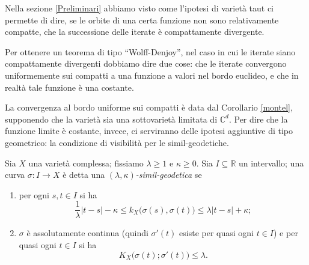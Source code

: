 Nella sezione \ref{Preliminari} abbiamo visto come l'ipotesi di varietà taut ci permette di dire, se le orbite di una certa funzione non sono relativamente compatte, che la successione delle iterate è compattamente divergente.

Per ottenere un teorema di tipo ``Wolff-Denjoy'', nel caso in cui le iterate siano compattamente divergenti dobbiamo dire due cose: che le iterate convergono uniformemente sui compatti a una funzione a valori nel bordo euclideo, e che in realtà tale funzione è una costante.

La convergenza al bordo uniforme sui compatti è data dal Corollario \ref{montel}, supponendo che la varietà sia una sottovarietà limitata di $\mathbb{C}^d$. Per dire che la funzione limite è costante, invece, ci serviranno delle ipotesi aggiuntive di tipo geometrico: la condizione di visibilità per le simil-geodetiche.

\begin{defn}
    Sia $X$ una varietà complessa; fissiamo $\lambda \ge 1$ e $\kappa \ge 0$. Sia $I\subseteq \mathbb{R}$ un intervallo; una curva $\sigma:I \longrightarrow X$ è detta una \textit{$(\lambda,\kappa)$-simil-geodetica} se
    \begin{enumerate}
        \item per ogni $s,t \in I$ si ha
        \begin{equation} \label{simil-geo1}
            \frac{1}{\lambda}|t-s|-\kappa \le k_X\big(\sigma(s),\sigma(t)\big)\le\lambda|t-s|+\kappa;
        \end{equation}
        \item $\sigma$ è assolutamente continua (quindi $\sigma'(t)$ esiste per quasi ogni $t \in I$) e per quasi ogni $t \in I$ si ha
        \begin{equation} \label{simil-geo2}
            K_X\big(\sigma(t);\sigma'(t)\big) \le \lambda.
        \end{equation}
    \end{enumerate}
\end{defn}

